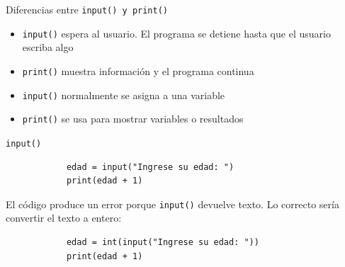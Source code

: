 \documentclass{beamer}
\begin{document}
    \begin{frame}[fragile,t]{Diferencias entre \texttt{input() y print()}}
        \begin{itemize}
            \item \texttt{input()} espera al usuario. El programa se detiene hasta que el usuario escriba algo
            \item \texttt{print()} muestra información y el programa continua
            \item \texttt{input()} normalmente se asigna a una variable
            \item \texttt{print()} se usa para mostrar variables o resultados
        \end{itemize}
    \end{frame}

    \begin{frame}[fragile,t]{\texttt{input()}}
        \begin{verbatim}
            edad = input("Ingrese su edad: ")
            print(edad + 1)
        \end{verbatim}
        El código produce un error porque \texttt{input()} devuelve texto. 
        Lo correcto sería convertir el texto a entero:

        \begin{verbatim}
            edad = int(input("Ingrese su edad: "))
            print(edad + 1)
        \end{verbatim}
    \end{frame}
    
\end{document}
